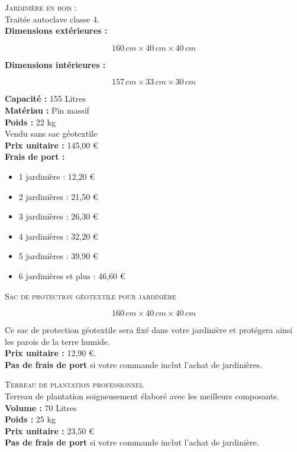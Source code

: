 \begin{multicols}{2}
\textsc{Jardinière en bois :} \\

Traitée autoclave classe 4. \\

\textbf{Dimensions extérieures :}

$$160\,cm \times 40\,cm \times 40\,cm$$

\textbf{Dimensions intérieures :}

$$157\,cm \times 33\,cm \times 30\,cm$$

\textbf{Capacité :} 155 Litres \\

\textbf{Matériau :} Pin massif \\ 

\textbf{Poids :} 22 kg \\

Vendu sans sac géotextile \\

\textbf{Prix unitaire :} 145,00 \euro  \\

\textbf{Frais de port : } \\
\begin{itemize}[label={$\bullet$}]
  \item 1 jardinière : 12,20 \euro 
  \item 2 jardinières : 21,50 \euro 
  \item 3 jardinières : 26,30 \euro 
  \item 4 jardinières : 32,20 \euro 
  \item 5 jardinières : 39,90 \euro 
  \item 6 jardinières et plus : 46,60 \euro 
\end{itemize} \columnbreak


\textsc{Sac de protection géotextile pour jardinière} 

$$160\,cm \times 40\,cm \times 40\,cm$$

Ce sac de protection géotextile sera fixé dans votre jardinière et protégera ainsi les parois de la terre humide. \\

\textbf{Prix unitaire :} 12,90 \euro . \\

\textbf{Pas de frais de port} si votre commande inclut l'achat de jardinières. \\ \medskip


\textsc{Terreau de plantation professionnel} \\

Terreau de plantation soigneusement élaboré avec les meilleurs composants. \\

\textbf{Volume :} 70 Litres \\

\textbf{Poids :} 25 kg \\

\textbf{Prix unitaire :} 23,50 \euro  \\

\textbf{Pas de frais de port} si votre commande inclut l'achat de jardinière.
\end{multicols}

